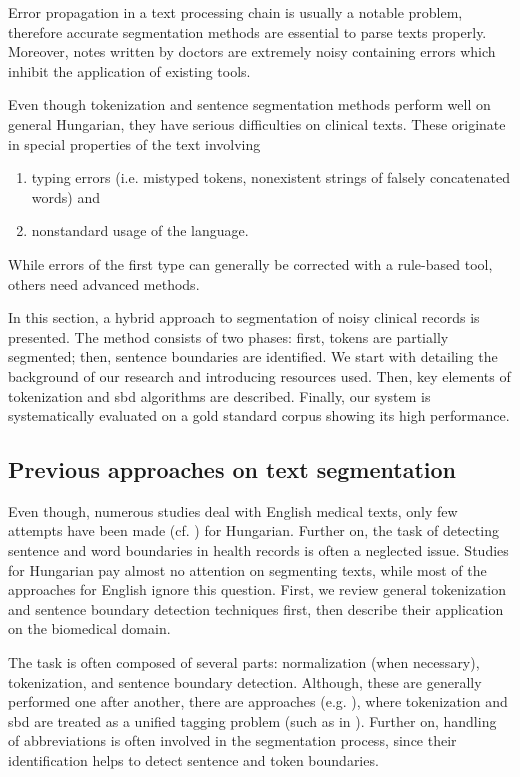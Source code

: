 Error propagation in a text processing chain is usually a notable problem, therefore accurate segmentation methods are essential to parse texts properly.
Moreover, notes written by doctors are extremely noisy containing errors which inhibit the application of existing tools.

Even though tokenization and sentence segmentation methods perform well on general Hungarian, they have serious difficulties on clinical texts.
These originate in special properties of the text involving
\begin{enumerate} %
 \item typing errors (i.e. mistyped tokens, nonexistent strings of falsely concatenated words) and
 \item nonstandard usage of the language.
\end{enumerate}
While errors of the first type can generally be corrected with a rule-based tool, others need advanced methods. 

In this section, a hybrid approach to segmentation of noisy clinical records is presented. 
The method consists of two phases: first, tokens are partially segmented; then, sentence boundaries are identified.
We start with detailing the background of our research and introducing resources used.
Then, key elements of tokenization and \gls{sbd} algorithms are described. 
Finally, our system is systematically evaluated on a gold standard corpus showing its high performance.

\subsection{Previous approaches on text segmentation}

Even though, numerous studies deal with English medical texts, only few attempts have been made (cf. \cite{Siklosi2012,Siklosi2013,Siklosi2013b}) for Hungarian. 
Further on, the task of detecting sentence and word boundaries in health records is often a neglected issue.
Studies for Hungarian pay almost no attention on segmenting texts, while
most of the approaches for English ignore this question. 
First, we review general tokenization and sentence boundary detection techniques first, then describe their application on the biomedical domain.

The task is often composed of several parts: normalization (when necessary), tokenization, and sentence boundary detection.  
Although, these are generally performed one after another, there are approaches (e.g. \cite{zhu2007unified}), where tokenization and \acrshort{sbd} are treated as a unified tagging problem (such as in \cite{mikheev2000tagging}). 
Further on, handling of abbreviations is often involved in the segmentation process, since their identification helps to detect sentence and token boundaries.


